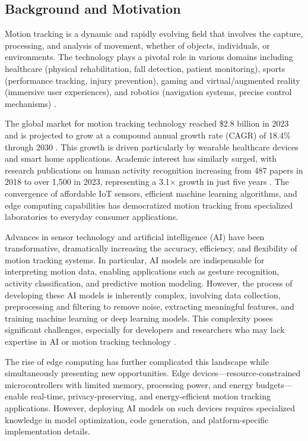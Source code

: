 \subsection{Background and Motivation}

Motion tracking is a dynamic and rapidly evolving field that involves the capture, processing, and analysis of movement, whether of objects, individuals, or environments. The technology plays a pivotal role in various domains including healthcare (physical rehabilitation, fall detection, patient monitoring), sports (performance tracking, injury prevention), gaming and virtual/augmented reality (immersive user experiences), and robotics (navigation systems, precise control mechanisms) \cite{article:human_motion_tracking_survey}.

The global market for motion tracking technology reached \$2.8 billion in 2023 and is projected to grow at a compound annual growth rate (CAGR) of 18.4\% through 2030 \cite{marketreport2023motion}. This growth is driven particularly by wearable healthcare devices and smart home applications. Academic interest has similarly surged, with research publications on human activity recognition increasing from 487 papers in 2018 to over 1,500 in 2023, representing a 3.1× growth in just five years \cite{wang2024har_comparative}. The convergence of affordable IoT sensors, efficient machine learning algorithms, and edge computing capabilities has democratized motion tracking from specialized laboratories to everyday consumer applications.

Advances in sensor technology and artificial intelligence (AI) have been transformative, dramatically increasing the accuracy, efficiency, and flexibility of motion tracking systems. In particular, AI models are indispensable for interpreting motion data, enabling applications such as gesture recognition, activity classification, and predictive motion modeling. However, the process of developing these AI models is inherently complex, involving data collection, preprocessing and filtering to remove noise, extracting meaningful features, and training machine learning or deep learning models. This complexity poses significant challenges, especially for developers and researchers who may lack expertise in AI or motion tracking technology \cite{article:motion_tracking_using_AI}.

The rise of edge computing has further complicated this landscape while simultaneously presenting new opportunities. Edge devices—resource-constrained microcontrollers with limited memory, processing power, and energy budgets—enable real-time, privacy-preserving, and energy-efficient motion tracking applications. However, deploying AI models on such devices requires specialized knowledge in model optimization, code generation, and platform-specific implementation details.

